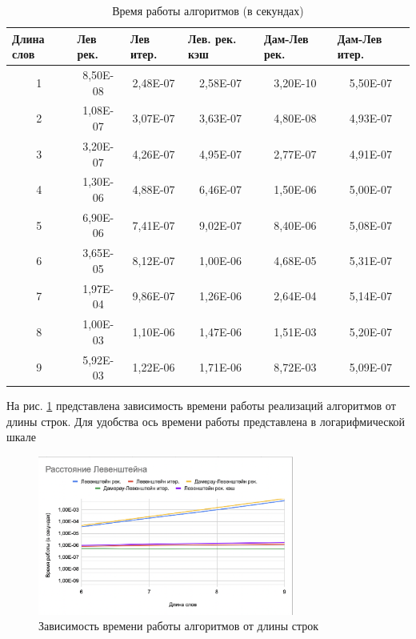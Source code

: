 \documentclass[12pt]{report}
\begin{document}
	\begin{table}[h]
		\centering
		\begin{tabular}{|c|c|c|c|c|c|}
		\hline
		\multicolumn{1}{|l|}{Длина слов} &
		  \multicolumn{1}{l|}{Лев рек.} &
		  \multicolumn{1}{l|}{Лев итер.} &
		  \multicolumn{1}{l|}{Лев. рек. кэш} &
		  \multicolumn{1}{l|}{Дам-Лев рек.} &
		  \multicolumn{1}{l|}{Дам-Лев итер.} \\ \hline
		1 & 8,50E-08 & 2,48E-07 & 2,58E-07 & 3,20E-10 & 5,50E-07 \\ \hline
		2 & 1,08E-07 & 3,07E-07 & 3,63E-07 & 4,80E-08 & 4,93E-07 \\ \hline
		3 & 3,20E-07 & 4,26E-07 & 4,95E-07 & 2,77E-07 & 4,91E-07 \\ \hline
		4 & 1,30E-06 & 4,88E-07 & 6,46E-07 & 1,50E-06 & 5,00E-07 \\ \hline
		5 & 6,90E-06 & 7,41E-07 & 9,02E-07 & 8,40E-06 & 5,08E-07 \\ \hline
		6 & 3,65E-05 & 8,12E-07 & 1,00E-06 & 4,68E-05 & 5,31E-07 \\ \hline
		7 & 1,97E-04 & 9,86E-07 & 1,26E-06 & 2,64E-04 & 5,14E-07 \\ \hline
		8 & 1,00E-03 & 1,10E-06 & 1,47E-06 & 1,51E-03 & 5,20E-07 \\ \hline
		9 & 5,92E-03 & 1,22E-06 & 1,71E-06 & 8,72E-03 & 5,09E-07 \\ \hline
		\end{tabular}
		\caption{Время работы алгоритмов (в секундах)}
		\label{tab:bench}
		\end{table}

	\pagebreak

	На рис. \ref{fig:plot} представлена зависимость времени работы реализаций алгоритмов от длины строк. Для удобства ось времени работы представлена в логарифмической шкале
	
	
	\begin{figure}[ht]
		\centering
		\includegraphics[width=0.75\textwidth]{plot.png}
		\caption{Зависимость времени работы алгоритмов от длины строк}
		\label{fig:plot}
	\end{figure}
\end{document}

